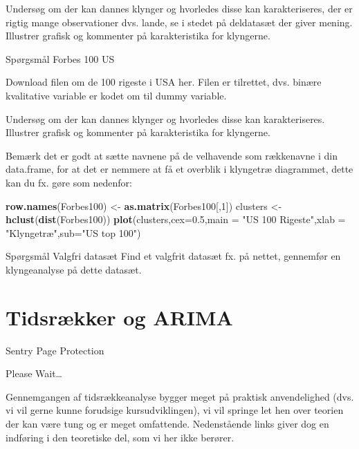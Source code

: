 \documentclass[]{book}
\newenvironment{Shaded}{\begin{snugshade}}{\end{snugshade}}
\newcommand{\DataTypeTok}[1]{\textcolor[rgb]{0.13,0.29,0.53}{#1}}
\newcommand{\DecValTok}[1]{\textcolor[rgb]{0.00,0.00,0.81}{#1}}
\newcommand{\FloatTok}[1]{\textcolor[rgb]{0.00,0.00,0.81}{#1}}
\newcommand{\KeywordTok}[1]{\textcolor[rgb]{0.13,0.29,0.53}{\textbf{#1}}}
\newcommand{\NormalTok}[1]{#1}
\newcommand{\StringTok}[1]{\textcolor[rgb]{0.31,0.60,0.02}{#1}}
\begin{document}
Undersøg om der kan dannes klynger og hvorledes disse kan karakteriseres, der er rigtig mange observationer dvs. lande, se i stedet på deldatasæt der giver mening. Illustrer grafisk og kommenter på karakteristika for klyngerne.

Spørgsmål Forbes 100 US

Download filen om de 100 rigeste i USA her. Filen er tilrettet, dvs. binære kvalitative variable er kodet om til dummy variable.

Undersøg om der kan dannes klynger og hvorledes disse kan karakteriseres. Illustrer grafisk og kommenter på karakteristika for klyngerne.

Bemærk det er godt at sætte navnene på de velhavende som rækkenavne i din data.frame, for at det er nemmere at få et overblik i klyngetræ diagrammet, dette kan du fx. gøre som nedenfor:

\begin{Shaded}
\begin{Highlighting}[]
\KeywordTok{row.names}\NormalTok{(Forbes100) <-}\StringTok{ }\KeywordTok{as.matrix}\NormalTok{(Forbes100[,}\DecValTok{1}\NormalTok{])}
\NormalTok{clusters <-}\StringTok{ }\KeywordTok{hclust}\NormalTok{(}\KeywordTok{dist}\NormalTok{(Forbes100))}
\KeywordTok{plot}\NormalTok{(clusters,}\DataTypeTok{cex=}\FloatTok{0.5}\NormalTok{,}\DataTypeTok{main =} \StringTok{"US 100 Rigeste"}\NormalTok{,}\DataTypeTok{xlab =} \StringTok{"Klyngetræ"}\NormalTok{,}\DataTypeTok{sub=}\StringTok{"US top 100"}\NormalTok{)}
\end{Highlighting}
\end{Shaded}

Spørgsmål Valgfri datasæt
Find et valgfrit datasæt fx. på nettet, gennemfør en klyngeanalyse på dette datasæt.

\hypertarget{tidsrkker-og-arima}{%
\chapter{Tidsrækker og ARIMA}\label{tidsrkker-og-arima}}

\hypertarget{Sentry_noJS}{}
Sentry Page Protection

\hypertarget{Sentry_redirecting}{}
Please Wait\ldots{}

Gennemgangen af tidsrækkeanalyse bygger meget på praktisk anvendelighed (dvs. vi vil gerne kunne forudsige kursudviklingen), vi vil springe let hen over teorien der kan være tung og er meget omfattende. Nedenstående links giver dog en indføring i den teoretiske del, som vi her ikke berører.
\end{document}
